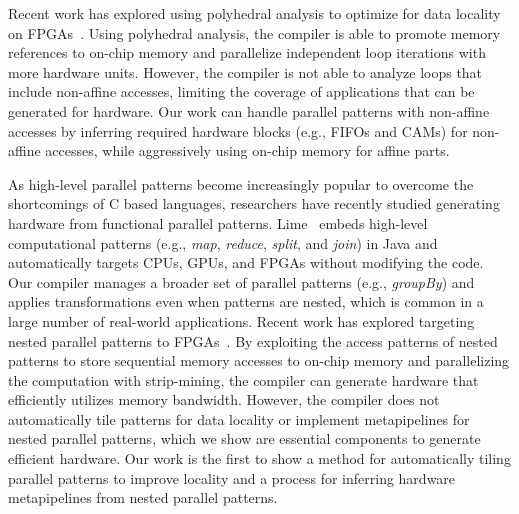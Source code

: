 \documentclass[pageno]{jpaper}
\begin{document}
Recent work has explored using polyhedral analysis to optimize for data
locality on FPGAs~\cite{pouchet13fpga}.  Using polyhedral analysis, the compiler
is able to promote memory references to on-chip memory and parallelize
independent loop iterations with more hardware units.  However, the compiler is
not able to analyze loops that include non-affine accesses, limiting the
coverage of applications that can be generated for hardware. Our work can
handle parallel patterns with non-affine accesses by inferring required
hardware blocks (e.g., FIFOs and CAMs) for non-affine accesses, while
aggressively using on-chip memory for affine parts.

As high-level parallel patterns become increasingly popular to overcome the
shortcomings of C based languages, researchers have recently studied generating
hardware from functional parallel patterns.  Lime~\cite{auerbach10lime}
embeds high-level computational patterns (e.g., \emph{map}, \emph{reduce}, \emph{split}, and \emph{join}) in
Java and automatically targets CPUs, GPUs, and FPGAs without modifying the
code.  Our compiler manages a broader set of parallel patterns (e.g., \emph{groupBy})
and applies transformations even when patterns are nested,
which is common in a large number of real-world applications.  Recent work has
explored targeting nested parallel patterns to
FPGAs~\cite{george14fpl}. By exploiting the access patterns of nested patterns
to store sequential memory accesses to on-chip memory and parallelizing the
computation with strip-mining, the compiler can generate hardware that
efficiently utilizes memory bandwidth.  However, the compiler does not
automatically tile patterns for data locality or implement metapipelines
for nested parallel patterns, which we show are essential components to
generate efficient hardware. Our work is the first to show a method for
automatically tiling parallel patterns to improve locality and a process
for inferring hardware metapipelines from nested parallel patterns.
\end{document}
